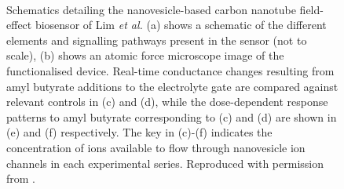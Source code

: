 \documentclass[
  a4paper,
]{scrbook}
\begin{document}
\begin{figure}
\begin{minipage}[t]{0.45\linewidth}
{{}

}

\end{minipage}%
%
\begin{minipage}[t]{0.01\linewidth}

{\centering 

~

}

\end{minipage}%

\caption[Schematics detailing the nanovesicle-based carbon nanotube
field-effect biosensor of Lim \emph{et
al.}]{\label{fig-lim-ion-channel}Schematics detailing the
nanovesicle-based carbon nanotube field-effect biosensor of Lim \emph{et
al.} (a) shows a schematic of the different elements and signalling
pathways present in the sensor (not to scale), (b) shows an atomic force
microscope image of the functionalised device. Real-time conductance
changes resulting from amyl butyrate additions to the electrolyte gate
are compared against relevant controls in (c) and (d), while the
dose-dependent response patterns to amyl butyrate corresponding to (c)
and (d) are shown in (e) and (f) respectively. The key in (c)-(f)
indicates the concentration of ions available to flow through
nanovesicle ion channels in each experimental series. Reproduced with
permission from \autocite{Lim2015}.}

\end{figure}
\end{document}
